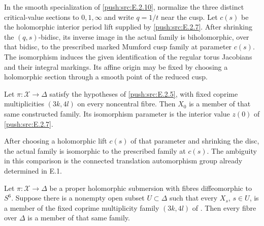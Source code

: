 \begin{proposition}\hypertarget{tag-0336}{}\label{push:src:E.2.20}


In the smooth specialization of \ref{push:src:E.2.10}, normalize
the three distinct critical-value sections to
$0,1,\infty$ and write $q=1/t$ near the cusp.
Let $c(s)$ be the holomorphic interior period
lift supplied by \ref{push:src:E.2.7}.  After shrinking the
$(q,s)$-bidisc, its inverse image in the actual
family is biholomorphic, over that bidisc, to
the prescribed marked Mumford cusp family at
parameter $c(s)$.  The isomorphism induces
the given identification of the regular
torus Jacobians and their integral markings.
Its affine origin may be fixed by choosing
a holomorphic section through a smooth
point of the reduced cusp.
\end{proposition}

\begin{proposition}\hypertarget{tag-0337}{}\label{push:src:E.2.21}


Let $\pi:\mathcal X\to\Delta$ satisfy the hypotheses of
\ref{push:src:E.2.5}, with fixed coprime multiplicities $(3k,4l)$ on
every noncentral fibre.  Then $X_0$ is a member of that
same constructed family.  Its isomorphism parameter is
the interior value $z(0)$ of \ref{push:src:E.2.7}.

After choosing a holomorphic lift $c(s)$ of that parameter
and shrinking the disc, the actual family is isomorphic
to the prescribed family at $c(s)$.  The ambiguity in
this comparison is the connected translation automorphism
group already determined in E.1.
\end{proposition}

\begin{proposition}\hypertarget{tag-0338}{}\label{push:src:E.2.22}


Let $\pi:\mathcal X\to\Delta$ be a proper holomorphic
submersion with fibres diffeomorphic to $S^6$.  Suppose
there is a nonempty open subset $U\subset\Delta$ such
that every $X_s$, $s\in U$, is a member of the fixed
coprime multiplicity family $(3k,4l)$ of .
Then every fibre over $\Delta$ is a member of that
same family.
\end{proposition}

